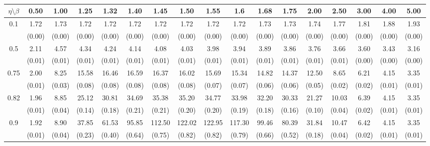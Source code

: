 \documentclass[12pt]{article}  %
\theoremstyle{plain}
\begin{document}
\begin{sidewaystable}[htbp]
\centering
{}

\ \\
\begin{tabular}{ccccccccccccccccc}
\hline
$\eta \setminus \beta $        & 0.50   & 1.00   & 1.25   & 1.32   & 1.40   & 1.45   & 1.50   & 1.55   & 1.6   & 1.68   & 1.75   & 2.00   & 2.50   & 3.00   & 4.00  &5.00 \\ \hline
\multirow{2}{*}{0.1}  & 1.72& 1.73 & 1.72 & 1.72  & 1.72  & 1.72  & 1.72  & 1.72   &1.72  & 1.73  & 1.73 & 1.74  &1.77 &1.81& 1.88& 1.93  \\
                      & (0.00) & (0.00) & (0.00) & (0.00) & (0.00) & (0.00) & (0.00) & (0.00) & (0.00) & (0.00) & (0.00) & (0.00) & (0.00) & (0.00) & (0.00) & (0.00)\\ \hline
\multirow{2}{*}{0.5}  &  2.11 &4.57 & 4.34 & 4.24  & 4.14  & 4.08  & 4.03 &  3.98 &  3.94  & 3.89  & 3.86 & 3.76 & 3.66& 3.60& 3.43& 3.16 \\
                      & (0.01) & (0.01) & (0.01) & (0.01) & (0.01) & (0.01) & (0.01) & (0.01) & (0.01) & (0.01) & (0.01) & (0.01)  & (0.01) & (0.00) & (0.00)&(0.00)\\ \hline
\multirow{2}{*}{0.75}  & 2.00 &8.25 &15.58& 16.46 & 16.59 & 16.37  &16.02 & 15.69 & 15.34 & 14.82 & 14.37 &12.50&  8.65 &6.21& 4.15& 3.35\\
                      & (0.01)& (0.03)& (0.08)& (0.08)& (0.08)& (0.08)& (0.08)& (0.07)& (0.07)& (0.06)&  (0.06)&  (0.05)&  (0.02)& (0.02)&  (0.01)&     (0.01)\\ \hline
\multirow{2}{*}{0.82}  & 1.96 &8.85 &25.12 &30.81 & 34.69 & 35.38 & 35.20 & 34.77 & 33.98 & 32.20 & 30.33 &21.27& 10.03& 6.39& 4.15& 3.35\\
                      & (0.01)& (0.04)& (0.14)& (0.18)& (0.21)& (0.21)& (0.20)& (0.20)& (0.19)&  (0.18)&  (0.16)&  (0.10)&  (0.04)&  (0.02)&  (0.01)&   (0.01)\\ \hline
\multirow{2}{*}{0.9}  & 1.92 &8.90 &37.85 &61.53 & 95.85& 112.50& 122.02 &122.95& 117.30 & 99.46 & 80.39& 31.84& 10.47& 6.42& 4.15& 3.35\\
                      & (0.01)& (0.04)& (0.23)& (0.40)& (0.64)& (0.75)& (0.82)& (0.82)& (0.79)&  (0.66)&  (0.52)&  (0.18)&  (0.04)&  (0.02)&  (0.01)&     (0.01)\\ \hline                                               

\end{tabular}
\end{sidewaystable}
\end{document}
